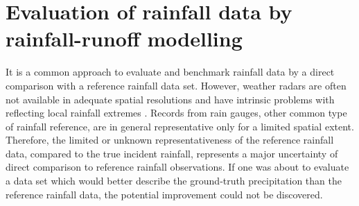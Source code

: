 \documentclass{ctuthesis}\usepackage[]{graphicx}\usepackage[]{color}
\begin{document}
        


\chapter{Evaluation of rainfall data by rainfall-runoff modelling} \label{chap2_5}


It is a common approach \citep[e.g.][]{fenclCommercialMicrowaveLinks2015, fenclGaugeadjustedRainfallEstimates2017, riosgaonaMeasurementInterpolationUncertainties2015, grafRainfallEstimationGermanwide2020} to evaluate and benchmark rainfall data by a direct comparison with a reference rainfall data set. However, weather radars are often not available in adequate spatial resolutions \citep{heistermannTechnicalNoteOpen2013, saltikoffOverviewUsingWeather2019} and have intrinsic problems with reflecting local rainfall extremes \citep{wangRadarRaingaugeData2013, borupDynamicGaugeAdjustment2016}. Records from rain gauges, other common type of rainfall reference, are in general representative only for a limited spatial extent. Therefore, the limited or unknown representativeness of the reference rainfall data, compared to the true incident rainfall, represents a major uncertainty of direct comparison to reference rainfall observations. If one was about to evaluate a data set which would better describe the ground‐truth precipitation than the reference rainfall data, the potential improvement could not be discovered. 

\end{document}
